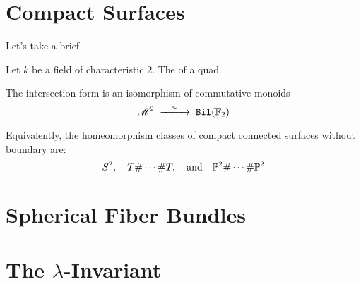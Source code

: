 \section{Compact Surfaces}

Let's take a brief 

\begin{definition}
  Let $k$ be a field of characteristic $2$.
  The  of a quad
\end{definition}

\begin{theorem}
	The intersection form is an isomorphism of commutative monoids
	\[
		\mathscr{M}^2\lkxisom \cat{Bil}(\F_2)
	\]
\end{theorem}
Equivalently, the homeomorphism classes of compact connected surfaces without boundary are:
\[
	S^2,\quad T\#\cdots \# T,\quad\textrm{and}\quad\P^2\#\cdots \# \P^2
\]

%   

\section{Spherical Fiber Bundles}


\section{The \texorpdfstring{$\lambda$}{λ}-Invariant}


